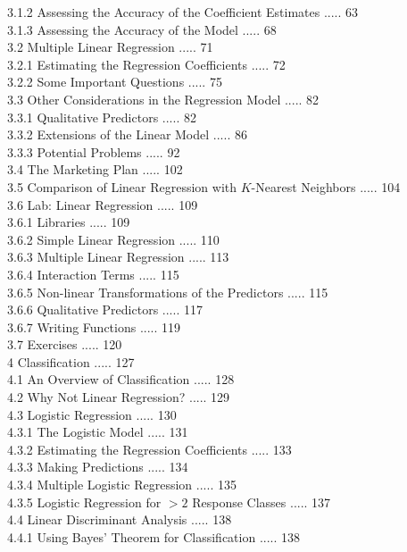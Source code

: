 \documentclass[10pt]{article}
\begin{document}
3.1.2 Assessing the Accuracy of the Coefficient Estimates ..... 63\\
3.1.3 Assessing the Accuracy of the Model ..... 68\\
3.2 Multiple Linear Regression ..... 71\\
3.2.1 Estimating the Regression Coefficients ..... 72\\
3.2.2 Some Important Questions ..... 75\\
3.3 Other Considerations in the Regression Model ..... 82\\
3.3.1 Qualitative Predictors ..... 82\\
3.3.2 Extensions of the Linear Model ..... 86\\
3.3.3 Potential Problems ..... 92\\
3.4 The Marketing Plan ..... 102\\
3.5 Comparison of Linear Regression with $K$-Nearest Neighbors ..... 104\\
3.6 Lab: Linear Regression ..... 109\\
3.6.1 Libraries ..... 109\\
3.6.2 Simple Linear Regression ..... 110\\
3.6.3 Multiple Linear Regression ..... 113\\
3.6.4 Interaction Terms ..... 115\\
3.6.5 Non-linear Transformations of the Predictors ..... 115\\
3.6.6 Qualitative Predictors ..... 117\\
3.6.7 Writing Functions ..... 119\\
3.7 Exercises ..... 120\\
4 Classification ..... 127\\
4.1 An Overview of Classification ..... 128\\
4.2 Why Not Linear Regression? ..... 129\\
4.3 Logistic Regression ..... 130\\
4.3.1 The Logistic Model ..... 131\\
4.3.2 Estimating the Regression Coefficients ..... 133\\
4.3.3 Making Predictions ..... 134\\
4.3.4 Multiple Logistic Regression ..... 135\\
4.3.5 Logistic Regression for $>2$ Response Classes ..... 137\\
4.4 Linear Discriminant Analysis ..... 138\\
4.4.1 Using Bayes' Theorem for Classification ..... 138\\
\end{document}
